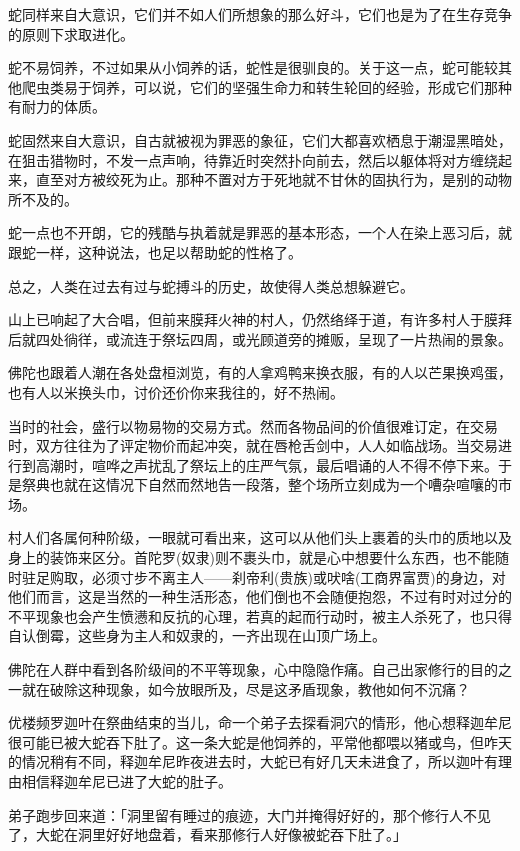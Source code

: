 \documentclass[12pt,twoside,openany]{book}
\begin{document}
蛇同样来自大意识，它们并不如人们所想象的那么好斗，它们也是为了在生存竞争的原则下求取进化。

蛇不易饲养，不过如果从小饲养的话，蛇性是很驯良的。关于这一点，蛇可能较其他爬虫类易于饲养，可以说，它们的坚强生命力和转生轮回的经验，形成它们那种有耐力的体质。

蛇固然来自大意识，自古就被视为罪恶的象征，它们大都喜欢栖息于潮湿黑暗处，在狙击猎物时，不发一点声响，待靠近时突然扑向前去，然后以躯体将对方缠绕起来，直至对方被绞死为止。那种不置对方于死地就不甘休的固执行为，是别的动物所不及的。

蛇一点也不开朗，它的残酷与执着就是罪恶的基本形态，一个人在染上恶习后，就跟蛇一样，这种说法，也足以帮助蛇的性格了。

总之，人类在过去有过与蛇搏斗的历史，故使得人类总想躲避它。

山上已响起了大合唱，但前来膜拜火神的村人，仍然络绎于道，有许多村人于膜拜后就四处徜徉，或流连于祭坛四周，或光顾道旁的摊贩，呈现了一片热闹的景象。

佛陀也跟着人潮在各处盘桓浏览，有的人拿鸡鸭来换衣服，有的人以芒果换鸡蛋，也有人以米换头巾，讨价还价你来我往的，好不热闹。

当时的社会，盛行以物易物的交易方式。然而各物品间的价值很难订定，在交易时，双方往往为了评定物价而起冲突，就在唇枪舌剑中，人人如临战场。当交易进行到高潮时，喧哗之声扰乱了祭坛上的庄严气氛，最后唱诵的人不得不停下来。于是祭典也就在这情况下自然而然地告一段落，整个场所立刻成为一个嘈杂喧嚷的市场。

村人们各属何种阶级，一眼就可看出来，这可以从他们头上裹着的头巾的质地以及身上的装饰来区分。首陀罗(奴隶)则不裹头巾，就是心中想要什么东西，也不能随时驻足购取，必须寸步不离主人——刹帝利(贵族)或吠啥(工商界富贾)的身边，对他们而言，这是当然的一种生活形态，他们倒也不会随便抱怨，不过有时对过分的不平现象也会产生愤懑和反抗的心理，若真的起而行动时，被主人杀死了，也只得自认倒霉，这些身为主人和奴隶的，一齐出现在山顶广场上。

佛陀在人群中看到各阶级间的不平等现象，心中隐隐作痛。自己出家修行的目的之一就在破除这种现象，如今放眼所及，尽是这矛盾现象，教他如何不沉痛？

优楼频罗迦叶在祭曲结束的当儿，命一个弟子去探看洞穴的情形，他心想释迦牟尼很可能已被大蛇吞下肚了。这一条大蛇是他饲养的，平常他都喂以猪或鸟，但咋天的情况稍有不同，释迦牟尼昨夜进去时，大蛇已有好几天未进食了，所以迦叶有理由相信释迦牟尼已进了大蛇的肚子。

弟子跑步回来道：「洞里留有睡过的痕迹，大门并掩得好好的，那个修行人不见了，大蛇在洞里好好地盘着，看来那修行人好像被蛇吞下肚了。」
\end{document}
